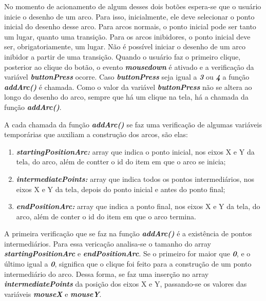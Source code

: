 \documentclass[
	12pt,				%
	openright,			%
	oneside,			%
	a4paper,			%
	english,			%
	brazil				%
	]{abntex2}
\begin{document}
No momento de acionamento de algum desses dois botões espera-se que o usuário inicie o desenho de um arco. Para isso, inicialmente, ele deve selecionar o ponto inicial do desenho desse arco. Para arcos normais, o ponto inicial pode ser tanto um lugar, quanto uma transição. Para os arcos inibidores, o ponto inicial deve ser, obrigatoriamente, um lugar. Não é possível iniciar o desenho de um arco inibidor a partir de uma transição. Quando o usuário faz o primeiro clique, posterior ao clique do botão, o evento \textbf{\textit{mousedown}} é ativado e a verificação da variável \textbf{\textit{buttonPress}} ocorre. Caso \textbf{\textit{buttonPress}} seja igual a \textbf{\textit{3}} ou \textbf{\textit{4}} a função \textbf{\textit{addArc()}} é chamada. Como o valor da variável \textbf{\textit{buttonPress}} não se altera ao longo do desenho do arco, sempre que há um clique na tela, há a chamada da função \textbf{\textit{addArc()}}.

A cada chamada da função \textbf{\textit{addArc()}} se faz uma verificação de algumas variáveis temporárias que auxiliam a construção dos arcos, são elas: 

\begin{enumerate}
	\item \textbf{\textit{startingPositionArc:}} array que indica o ponto inicial, nos eixos X e Y da tela, do arco, além de contter o id do item em que o arco se inicia;
	\item \textbf{\textit{intermediatePoints:}} array que indica todos os pontos intermediários, nos eixos X e Y da tela, depois do ponto inicial e antes do ponto final;
	\item \textbf{\textit{endPositionArc:}} array que indica a ponto final, nos eixos X e Y da tela, do arco, além de conter o id do item em que o arco termina.
\end{enumerate}

A primeira verificação que se faz na função \textbf{\textit{addArc()}} é a existência de pontos intermediários. Para essa vericação analisa-se o tamanho do array \textbf{\textit{startingPositionArc}} e \textbf{\textit{endPositionArc}}. Se o primeiro for maior que \textbf{\textit{0}}, e o último igual a \textit{\textbf{0}}, significa que o clique foi feito para a construção de um ponto intermediário do arco. Dessa forma, se faz uma inserção no array \textbf{\textit{intermediatePoints}} da posição dos eixos X e Y, passando-se os valores das variáveis \textbf{\textit{mouseX}} e \textbf{\textit{mouseY}}.


\end{document}
